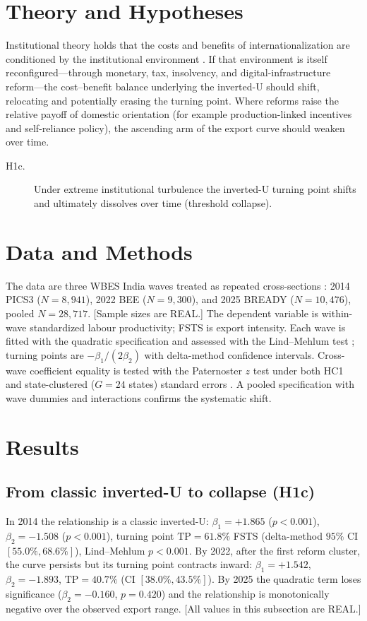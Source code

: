 \documentclass[12pt,a4paper]{article}
\begin{document}
\section{Theory and Hypotheses}
Institutional theory holds that the costs and benefits of internationalization
are conditioned by the institutional environment \citep{north1990,khanna2010}.
If that environment is itself reconfigured---through monetary, tax, insolvency,
and digital-infrastructure reform---the cost--benefit balance underlying the
inverted-U should shift, relocating and potentially erasing the turning point.
Where reforms raise the relative payoff of domestic orientation (for example
production-linked incentives and self-reliance policy), the ascending arm of
the export curve should weaken over time.

\begin{description}
\item[H1c.] Under extreme institutional turbulence the inverted-U turning
point shifts and ultimately dissolves over time (threshold collapse).
\end{description}

\section{Data and Methods}
The data are three WBES India waves treated as repeated cross-sections
\citep{deaton1985,verbeek2008}: 2014 PICS3 ($N=8{,}941$), 2022 BEE
($N=9{,}300$), and 2025 BREADY ($N=10{,}476$), pooled $N=28{,}717$. [Sample
sizes are REAL.] The dependent variable is within-wave standardized labour
productivity; FSTS is export intensity. Each wave is fitted with the quadratic
specification and assessed with the Lind--Mehlum test \citep{lindmehlum2010};
turning points are $-\beta_1/(2\beta_2)$ with delta-method confidence
intervals. Cross-wave coefficient equality is tested with the Paternoster
$z$ test \citep{paternoster1998} under both HC1 and state-clustered
($G=24$ states) standard errors \citep{cameron2015}. A pooled
specification with wave dummies and interactions confirms the systematic
shift.

\section{Results}
\subsection{From classic inverted-U to collapse (H1c)}
In 2014 the relationship is a classic inverted-U:
$\beta_1=+1.865$ ($p<0.001$), $\beta_2=-1.508$ ($p<0.001$), turning point
$\mathrm{TP}=61.8\%$ FSTS (delta-method $95\%$ CI $[55.0\%, 68.6\%]$),
Lind--Mehlum $p<0.001$. By 2022, after the first reform cluster, the curve
persists but its turning point contracts inward: $\beta_1=+1.542$,
$\beta_2=-1.893$, $\mathrm{TP}=40.7\%$ (CI $[38.0\%, 43.5\%]$). By 2025 the
quadratic term loses significance ($\beta_2=-0.160$, $p=0.420$) and the
relationship is monotonically negative over the observed export range. [All
values in this subsection are REAL.]
\end{document}
